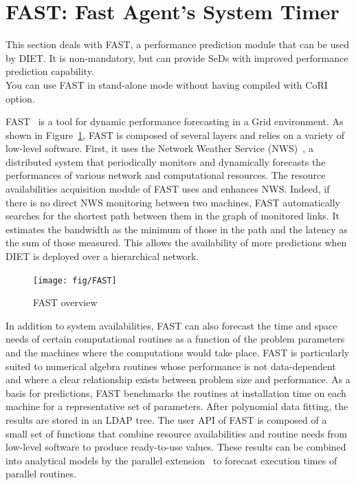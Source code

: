\section{FAST: Fast Agent's System Timer}
\label{sec:FAST}

This section deals with FAST, a performance prediction module that can
be used by DIET. It is non-mandatory, but can provide SeDs with
improved performance prediction capability.\\
You can use FAST in stand-alone mode without having compiled with
CoRI option.

FAST~\cite{Qui02} is a tool for dynamic performance forecasting in a
Grid environment. As shown in Figure~\ref{fig:fast-overview}, FAST
is composed of several layers and relies on a variety of low-level
software. First, it uses the Network Weather Service
(NWS)~\cite{WSH99}, a distributed system that periodically monitors
and dynamically forecasts the performances of various network and
computational resources. The resource availabilities acquisition
module of FAST uses and enhances NWS. Indeed, if there is no direct
NWS monitoring between two machines, FAST automatically searches for
the shortest path between them in the graph of monitored links. It
estimates the bandwidth as the minimum of those in the path and the
latency as the sum of those measured. This allows the
availability of more predictions when DIET is deployed over a
hierarchical network.

\begin{figure}[htb]
  \begin{center}
    \texttt{[image: fig/FAST]}
    \caption{FAST overview}
    \label{fig:fast-overview}
  \end{center}
\end{figure}

In addition to system availabilities, FAST can also forecast the
time and space needs of certain computational routines as a function
of the problem parameters and the machines where the computations
would take place.  FAST is particularly suited to numerical algebra
routines whose performance is not data-dependent and where a clear
relationship exists between problem size and performance. As a basis
for predictions, FAST benchmarks the routines at installation time
on each machine for a representative set of parameters. After
polynomial data fitting, the results are stored in an LDAP tree. The
user API of FAST is composed of a small set of functions that
combine resource availabilities and routine needs from low-level
software to produce ready-to-use values.  These results can be
combined into analytical models by the parallel
extension~\cite{CS02} to forecast execution times of parallel
routines.


